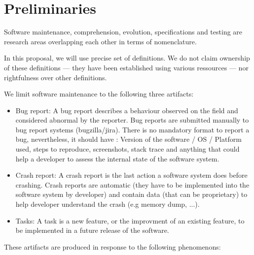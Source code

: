 \section{Preliminaries\label{sec:preliminaries}}

Software maintenance, comprehension, evolution, specifications and testing are research areas overlapping each other in terms of nomenclature.

In this proposal, we will use precise set of definitions.
We do not claim ownership of these definitions --- they have been established using various ressources --- nor rightfulness over other definitions.

We limit software maintenance to the following three artifacts:

\begin{itemize}
	\item Bug report: A bug report describes a behaviour observed on the field and considered abnormal by the reporter. Bug reports are submitted manually to bug report systems (bugzilla/jira). There is no mandatory format to report a bug, nevertheless, it should have : Version of the software / OS / Platform used, steps to reproduce, screenshots, stack trace and anything that could help a developer to assess the internal state of the software system.
	\item Crash report: A crash report is the last action a software system does before crashing. Crash reports are automatic (they have to be implemented into the software system by developer) and contain data (that can be proprietary) to help developer understand the crash (e.g memory dump, ...).
	\item Tasks: A task is a new feature, or the improvment of an existing feature, to be implemented in a future release of the software.
\end{itemize}

These artifacts are produced in response to the following phenomenons:


